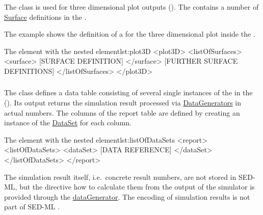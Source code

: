 \subsubsection{}
\label{class:plot3D}
The  class is used for three dimensional plot outputs (). The  contains a number of \hyperref[class:surface]{Surface} definitions in the . 

The example shows the definition of a \hyperref[class:surface]{} for the three dimensional plot inside the .
\begin{myXmlLst}{The  element with the nested  element}{lst:plot3D}
<plot3D>
	<listOfSurfaces>
		<surface> 
			[SURFACE DEFINITION]
		</surface>
		[FURTHER SURFACE DEFINITIONS]
	</listOfSurfaces>
</plot3D>
\end{myXmlLst}


\subsubsection{}
\label{class:report}
The  class defines a data table consisting of several single instances of the \hyperref[class:dataSet]{} in the  (). Its output returns the simulation result processed via \hyperref[class:dataGenerator]{DataGenerators} in actual numbers. The columns of the report table are defined by creating an instance of the \hyperref[class:dataSet]{DataSet} for each column. 


\begin{myXmlLst}{The  element with the nested  element}{lst:listOfDataSets}
<report>
	<listOfDataSets>
		<dataSet>
			[DATA REFERENCE]
		</dataSet>
	</listOfDataSets>
</report>
\end{myXmlLst}

The simulation result itself, i.e.\ concrete result numbers, are not stored in SED-ML, but the directive how to calculate them from the output of the simulator is provided through the \hyperref[class:dataGenerator]{dataGenerator}. The encoding of simulation results is not part of SED-ML \currentLV.

